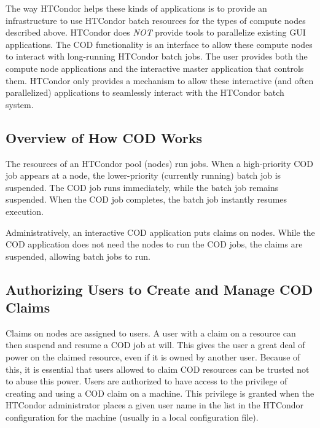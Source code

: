 The way HTCondor helps these kinds of applications is to provide an
infrastructure to use HTCondor batch resources for the types of compute
nodes described above.
HTCondor does \emph{NOT} provide tools to parallelize existing GUI
applications.
The COD functionality is an interface to allow these compute nodes to
interact with long-running HTCondor batch jobs.
The user provides both the compute node applications and the
interactive master application that controls them.
HTCondor only provides a mechanism to allow these interactive (and often
parallelized) applications to seamlessly interact with the HTCondor
batch system.


\subsection{\label{sec:cod-overview}
Overview of How COD Works}

The resources of an HTCondor pool (nodes)
run jobs.
When a high-priority COD job appears at a node,
the lower-priority (currently running) batch job is
suspended.
The COD job runs immediately, while the batch job remains suspended.
When the COD job completes, the batch job instantly resumes execution.

Administratively,
an interactive COD application puts claims on nodes.
While the COD application does not need the nodes to run the
COD jobs,  the claims are suspended, allowing batch jobs to run.


\subsection{\label{sec:cod-authorizing}
Authorizing Users to Create and Manage COD Claims}

Claims on nodes are assigned to users.
A user with a claim on a resource can then suspend and
resume a COD job at will.
This gives the user a great deal of power on the claimed resource,
even if it is owned by another user.
Because of this, it is essential that users allowed to claim
COD resources can be
trusted not to abuse this power.
Users are authorized to have access to the privilege
of creating and using a COD claim on a machine.
This privilege is granted when the HTCondor administrator places a given
user name in the  list in the HTCondor
configuration for the machine (usually in a local configuration file).

